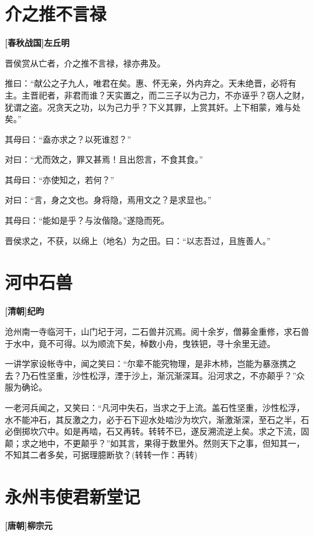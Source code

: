 \documentclass[UTF8,titlepage,oneside]{ctexbook}
\begin{document}
\chapter*{介之推不言禄}
\begin{center}
	\textbf{[春秋战国]左丘明}
\end{center}


晋侯赏从亡者，介之推不言禄，禄亦弗及。


推曰：“献公之子九人，唯君在矣。惠、怀无亲，外内弃之。天未绝晋，必将有主。主晋祀者，非君而谁？天实置之，而二三子以为己力，不亦诬乎？窃人之财，犹谓之盗。况贪天之功，以为己力乎？下义其罪，上赏其奸。上下相蒙，难与处矣。”


其母曰：“盍亦求之？以死谁怼？”


对曰：“尤而效之，罪又甚焉！且出怨言，不食其食。”


其母曰：“亦使知之，若何？”


对曰：“言，身之文也。身将隐，焉用文之？是求显也。”


其母曰：“能如是乎？与汝偕隐。”遂隐而死。


晋侯求之，不获，以绵上（地名）为之田。曰：“以志吾过，且旌善人。”



\chapter*{河中石兽}
\begin{center}
	\textbf{[清朝]纪昀}
\end{center}


沧州南一寺临河干，山门圮于河，二石兽并沉焉。阅十余岁，僧募金重修，求石兽于水中，竟不可得。以为顺流下矣，棹数小舟，曳铁钯，寻十余里无迹。


一讲学家设帐寺中，闻之笑曰：“尔辈不能究物理，是非木杮，岂能为暴涨携之去？乃石性坚重，沙性松浮，湮于沙上，渐沉渐深耳。沿河求之，不亦颠乎？”众服为确论。


一老河兵闻之，又笑曰：“凡河中失石，当求之于上流。盖石性坚重，沙性松浮，水不能冲石，其反激之力，必于石下迎水处啮沙为坎穴，渐激渐深，至石之半，石必倒掷坎穴中。如是再啮，石又再转。转转不已，遂反溯流逆上矣。求之下流，固颠；求之地中，不更颠乎？”如其言，果得于数里外。然则天下之事，但知其一，不知其二者多矣，可据理臆断欤？(转转一作：再转)


\chapter*{永州韦使君新堂记}
\begin{center}
	\textbf{[唐朝]柳宗元}
\end{center}
\end{document}
